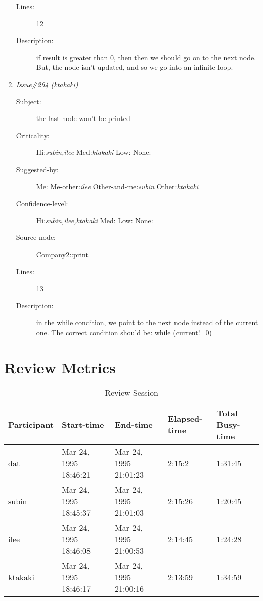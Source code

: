\begin{enumerate}
\begin{description}
\item [Lines:] 12

\item [Description:] if result is greater than 0, then then
we should go on to the next node.  But, the node isn't updated, and so we go
into an infinite loop.
\end{description}
\item {\it Issue\#264 (ktakaki)}
\begin{description}
\item [Subject:] the last node won't be printed
\item [Criticality:] Hi:{\it subin,ilee} Med:{\it ktakaki} Low:{\it } None:{\it }
\item [Suggested-by:] Me:{\it } Me-other:{\it ilee} Other-and-me:{\it subin} Other:{\it ktakaki}
\item [Confidence-level:] Hi:{\it subin,ilee,ktakaki} Med:{\it } Low:{\it } None:{\it }
\item [Source-node:] Company2::print

\item [Lines:] 13

\item [Description:] in the while condition, we point to the  
next node instead of the current one.  The correct condition should be: while
(current!=0)
\end{description}
\end{enumerate}
\section{Review Metrics}
\begin{table}[hb]
\begin{center}
\begin{tabular}{|l|l|l|l|l|}
\hline
Participant & Start-time & End-time & Elapsed-time & Total Busy-time \\
\hline
dat & Mar 24, 1995 18:46:21 & Mar 24, 1995 21:01:23 & 2:15:2 & 1:31:45 \\
subin & Mar 24, 1995 18:45:37 & Mar 24, 1995 21:01:03 & 2:15:26 & 1:20:45 \\
ilee & Mar 24, 1995 18:46:08 & Mar 24, 1995 21:00:53 & 2:14:45 & 1:24:28 \\
ktakaki & Mar 24, 1995 18:46:17 & Mar 24, 1995 21:00:16 & 2:13:59 & 1:34:59 \\
\hline
\end{tabular}
\end{center}
\caption{Review Session}
\end{table}


